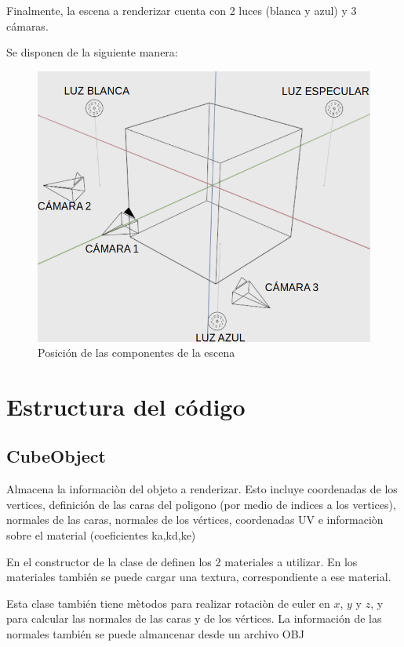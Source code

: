 \documentclass[12pt]{article}
\begin{document}
Finalmente, la escena a renderizar cuenta con 2 luces (blanca y azul) y 3 cámaras.

Se disponen de la siguiente manera: 


\begin{figure}[H]
\centering
\includegraphics[scale=0.3]{images/ESCENAA.png}
\caption{Posición de las componentes de la escena}
\end{figure}






\section{Estructura del código}


 \subsection{CubeObject}
Almacena la informaciòn del objeto a renderizar. Esto incluye coordenadas de los vertices, definición de las caras del poligono (por medio de indices a los vertices), normales de las caras, normales de los vértices, coordenadas UV e informaciòn sobre el material (coeficientes ka,kd,ke)

En el constructor de la clase de definen los 2 materiales a utilizar. En los materiales también se puede cargar una textura, correspondiente a ese material.

Esta clase también tiene mètodos para realizar rotaciòn de euler en $x$, $y$ y $z$, y para calcular las normales de las caras y de los vértices. La información de las normales también se puede almancenar desde un archivo OBJ
\end{document}
